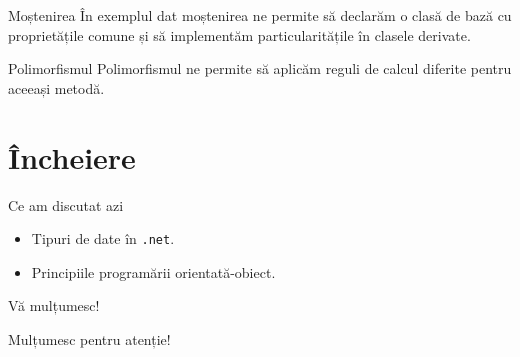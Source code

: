 \documentclass[presentation]{beamer}
\begin{document}
\begin{frame}[label={sec:org0f0cf3f}]{Moștenirea}
În exemplul dat \alert{moștenirea} ne permite să declarăm o clasă de bază cu proprietățile comune și să implementăm particularitățile în clasele derivate.
\end{frame}
\begin{frame}[label={sec:orgf9e6a6e}]{Polimorfismul}
\alert{Polimorfismul} ne permite să aplicăm reguli de calcul diferite pentru aceeași metodă.
\end{frame}
\section{Încheiere}
\label{sec:org5b4f986}
\begin{frame}[label={sec:org59050df},fragile]{Ce am discutat azi}
 \begin{itemize}
\item Tipuri de date în \texttt{.net}.
\item Principiile programării orientată-obiect.
\end{itemize}
\end{frame}
\begin{frame}[label={sec:org829af9d}]{Vă mulțumesc!}
\begin{center}
Mulțumesc pentru atenție!
\end{center}
\end{frame}
\end{document}
